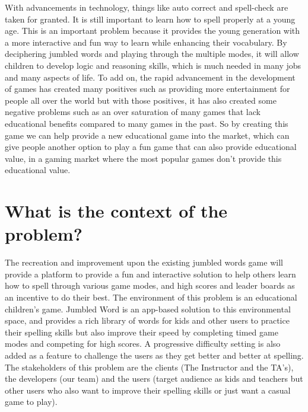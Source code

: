 \documentclass{article}
\begin{document}
With advancements in technology, things like auto correct and spell-check are taken for granted. It is still important to learn how to spell properly at a young age. This is an important problem because it provides the young generation with a more interactive and fun way to learn while enhancing their vocabulary. By deciphering jumbled words and playing through the multiple modes, it will allow children to develop logic and reasoning skills, which is much needed in many jobs and many aspects of life. To add on, the rapid advancement in the development of games has created many positives such as providing more entertainment for people all over the world but with those positives, it has also created some negative problems such as an over saturation of many games that lack educational benefits compared to many games in the past. So by creating this game we can help provide a new educational game into the market, which can give people another option to play a fun game that can also provide educational value, in a gaming market where the most popular games don’t provide this educational value.

\section{What is the context of the problem?}

The recreation and improvement upon the existing jumbled words game will provide a platform to provide a fun and interactive solution to help others learn how to spell through various game modes, and high scores and leader boards as an incentive to do their best. The environment of this problem is an educational children’s game. Jumbled Word is an app-based solution to this environmental space, and provides a rich library of words for kids and other users to practice their spelling skills but also improve their speed by completing timed game modes and competing for high scores. A progressive difficulty setting is also added as a feature to challenge the users as they get better and better at spelling. The stakeholders of this problem are the clients (The Instructor and the TA’s), the developers (our team) and the users (target audience as kids and teachers but other users who also want to improve their spelling skills or just want a casual game to play).




\end{document}
